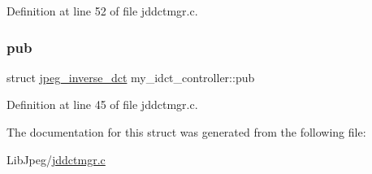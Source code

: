 Definition at line 52 of file jddctmgr.\+c.

\mbox{\label{structmy__idct__controller_ace0aef71b868fc10da51a4be6f8b56ca}} 
\subsubsection{\texorpdfstring{pub}{pub}}
{\footnotesize\ttfamily struct \mbox{\hyperlink{structjpeg__inverse__dct}{jpeg\+\_\+inverse\+\_\+dct}} my\+\_\+idct\+\_\+controller\+::pub}



Definition at line 45 of file jddctmgr.\+c.



The documentation for this struct was generated from the following file\+:\begin{DoxyCompactItemize}
\item 
Lib\+Jpeg/\mbox{\hyperlink{jddctmgr_8c}{jddctmgr.\+c}}\end{DoxyCompactItemize}
